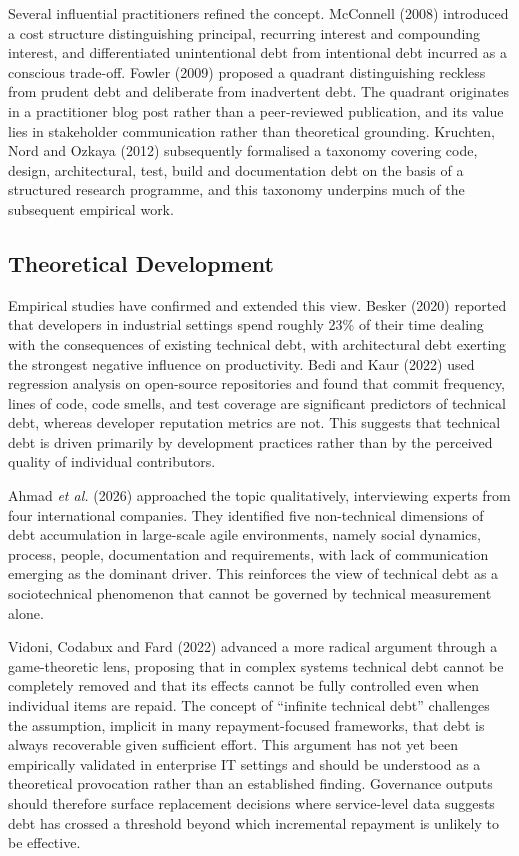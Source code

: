 \documentclass[
  12pt,
  letterpaper,
  12pt,
  oneside,
  english,
  onehalfspacing,
  headsepline]{MastersDoctoralThesis}
\begin{document}
Several influential practitioners refined the concept. McConnell (2008)
introduced a cost structure distinguishing principal, recurring interest
and compounding interest, and differentiated unintentional debt from
intentional debt incurred as a conscious trade-off. Fowler (2009)
proposed a quadrant distinguishing reckless from prudent debt and
deliberate from inadvertent debt. The quadrant originates in a
practitioner blog post rather than a peer-reviewed publication, and its
value lies in stakeholder communication rather than theoretical
grounding. Kruchten, Nord and Ozkaya (2012) subsequently formalised a
taxonomy covering code, design, architectural, test, build and
documentation debt on the basis of a structured research programme, and
this taxonomy underpins much of the subsequent empirical work.

\subsection{Theoretical Development}\label{theoretical-development}

Empirical studies have confirmed and extended this view. Besker (2020)
reported that developers in industrial settings spend roughly 23\% of
their time dealing with the consequences of existing technical debt,
with architectural debt exerting the strongest negative influence on
productivity. Bedi and Kaur (2022) used regression analysis on
open-source repositories and found that commit frequency, lines of code,
code smells, and test coverage are significant predictors of technical
debt, whereas developer reputation metrics are not. This suggests that
technical debt is driven primarily by development practices rather than
by the perceived quality of individual contributors.

Ahmad \emph{et al.} (2026) approached the topic qualitatively,
interviewing experts from four international companies. They identified
five non-technical dimensions of debt accumulation in large-scale agile
environments, namely social dynamics, process, people, documentation and
requirements, with lack of communication emerging as the dominant
driver. This reinforces the view of technical debt as a sociotechnical
phenomenon that cannot be governed by technical measurement alone.

Vidoni, Codabux and Fard (2022) advanced a more radical argument through
a game-theoretic lens, proposing that in complex systems technical debt
cannot be completely removed and that its effects cannot be fully
controlled even when individual items are repaid. The concept of
``infinite technical debt'' challenges the assumption, implicit in many
repayment-focused frameworks, that debt is always recoverable given
sufficient effort. This argument has not yet been empirically validated
in enterprise IT settings and should be understood as a theoretical
provocation rather than an established finding. Governance outputs
should therefore surface replacement decisions where service-level data
suggests debt has crossed a threshold beyond which incremental repayment
is unlikely to be effective.
\end{document}
